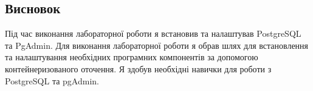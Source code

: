 \documentclass[14pt]{extreport}
\begin{document}
\begin{normalsize}
	\section*{Висновок}
	Під час виконання лабораторної роботи я встановив та налаштував PostgreSQL та PgAdmin. Для виконання лабораторної роботи я обрав шлях для встановлення та налаштування необхідних програмних компонентів за допомогою контейнеризованого оточення. Я здобув необхідні навички для роботи з PostgreSQL та pgAdmin.
	 
\end{normalsize}
\end{document}
